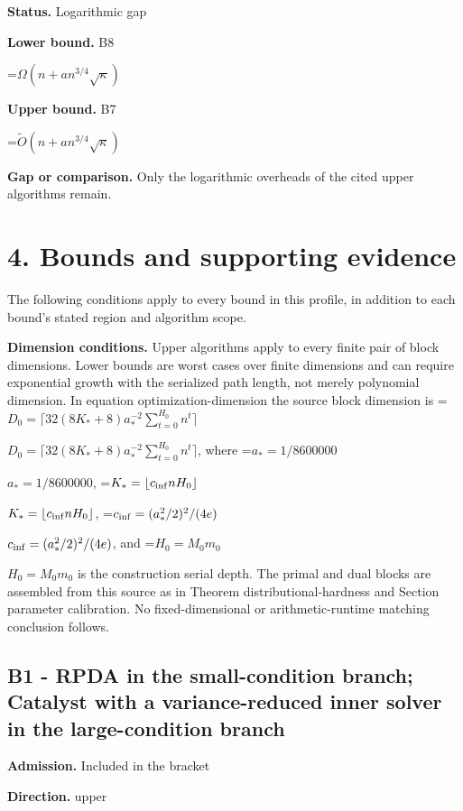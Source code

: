 \documentclass[10pt,a4paper]{article}
\newcommand{\AtlasMath}[1]{\par\begingroup\centering\setbox0=\hbox{$\displaystyle #1$}\ifdim\wd0>1.4\linewidth\typeout{ATLAS WIDE FORMULA: \the\wd0}\fi\ifdim\wd0>\linewidth\resizebox{\linewidth}{!}{\box0}\else\box0\fi\par\endgroup}
\newcommand{\AtlasInlineMath}[1]{\begingroup\setbox0=\hbox{$#1$}\ifdim\wd0>.4\linewidth\endgroup\AtlasMath{#1}\else\endgroup$#1$\fi}
\begin{document}
\textbf{Status.} Logarithmic gap



\textbf{Lower bound.} B8



\AtlasMath{\Omega(n+a n^{3/4}\sqrt\kappa)}


\textbf{Upper bound.} B7



\AtlasMath{\widetilde O(n+a n^{3/4}\sqrt\kappa)}


\textbf{Gap or comparison.} Only the logarithmic overheads of the cited upper algorithms remain.



\section{4. Bounds and supporting evidence}


The following conditions apply to every bound in this profile, in addition to each bound's stated region and algorithm scope.



\textbf{Dimension conditions.} Upper algorithms apply to every finite pair of block dimensions. Lower bounds are worst cases over finite dimensions and can require exponential growth with the serialized path length, not merely polynomial dimension. In equation optimization-dimension the source block dimension is \AtlasInlineMath{D_0=\lceil32(8K_*+8)a_*^{-2}\sum_{t=0}^{H_0}n^t\rceil}, where \AtlasInlineMath{a_*=1/8600000}, \AtlasInlineMath{K_*=\lfloor c_{\rm inf}nH_0\rfloor}, \AtlasInlineMath{c_{\rm inf}=(a_*^2/2)^2/(4e)}, and \AtlasInlineMath{H_0=M_0m_0} is the construction serial depth. The primal and dual blocks are assembled from this source as in Theorem distributional-hardness and Section parameter calibration. No fixed-dimensional or arithmetic-runtime matching conclusion follows.



\subsection{B1 - RPDA in the small-condition branch; Catalyst with a variance-reduced inner solver in the large-condition branch}


\textbf{Admission.} Included in the bracket



\textbf{Direction.} upper
\end{document}
